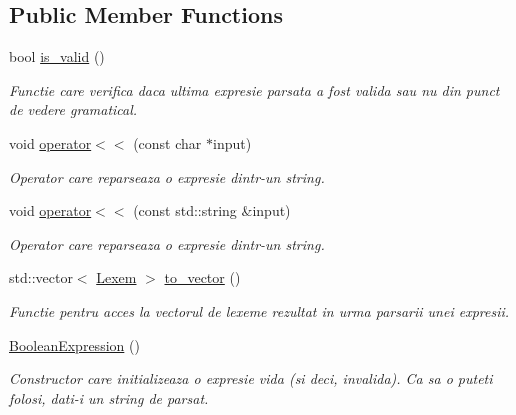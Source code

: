 \subsection*{Public Member Functions}
\begin{DoxyCompactItemize}
\item 
bool \hyperlink{classBooleanExpression_a15ce0a130f0ae05ba2e6a62a222b5c0e}{is\_\-valid} ()
\begin{DoxyCompactList}\small\item\em Functie care verifica daca ultima expresie parsata a fost valida sau nu din punct de vedere gramatical. \end{DoxyCompactList}\item 
\hypertarget{classBooleanExpression_a59d5385cc58e0d0452b96bed1f6a6984}{
void \hyperlink{classBooleanExpression_a59d5385cc58e0d0452b96bed1f6a6984}{operator$<$$<$} (const char $\ast$input)}
\label{classBooleanExpression_a59d5385cc58e0d0452b96bed1f6a6984}

\begin{DoxyCompactList}\small\item\em Operator care reparseaza o expresie dintr-\/un string. \end{DoxyCompactList}\item 
\hypertarget{classBooleanExpression_ad8e8ad03eae2b0813deee52ed00228a0}{
void \hyperlink{classBooleanExpression_ad8e8ad03eae2b0813deee52ed00228a0}{operator$<$$<$} (const std::string \&input)}
\label{classBooleanExpression_ad8e8ad03eae2b0813deee52ed00228a0}

\begin{DoxyCompactList}\small\item\em Operator care reparseaza o expresie dintr-\/un string. \end{DoxyCompactList}\item 
std::vector$<$ \hyperlink{classBooleanExpression_a299abbbf6a12738e2d9df792d50ccd76}{Lexem} $>$ \hyperlink{classBooleanExpression_a146ead302b7f836a40e598117ef57c6d}{to\_\-vector} ()
\begin{DoxyCompactList}\small\item\em Functie pentru acces la vectorul de lexeme rezultat in urma parsarii unei expresii. \end{DoxyCompactList}\item 
\hypertarget{classBooleanExpression_a499193b6f7b6a0242cfeb2563e96732e}{
\hyperlink{classBooleanExpression_a499193b6f7b6a0242cfeb2563e96732e}{BooleanExpression} ()}
\label{classBooleanExpression_a499193b6f7b6a0242cfeb2563e96732e}

\begin{DoxyCompactList}\small\item\em Constructor care initializeaza o expresie vida (si deci, invalida). Ca sa o puteti folosi, dati-\/i un string de parsat. \end{DoxyCompactList}\end{DoxyCompactItemize}
